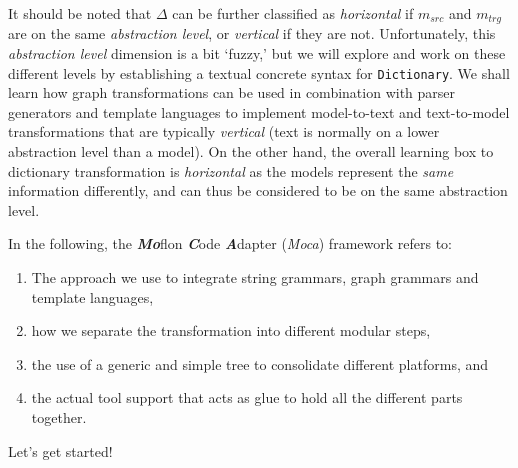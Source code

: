 \newpage

It should be noted that $\Delta$ can be further classified as \emph{horizontal} if $m_{src}$ and $m_{trg}$ are on the same
\emph{abstraction level}, or \emph{vertical} if they are not. Unfortunately, this \emph{abstraction level} dimension is a bit `fuzzy,' but we will explore and
work on these different levels by establishing a textual concrete syntax for \texttt{Dictionary}. We shall learn how graph transformations can be used in
combination with parser generators and template languages to implement model-to-text and text-to-model transformations that are typically \emph{vertical} (text
is normally on a lower abstraction level than a model). On the other hand, the overall learning box to dictionary transformation is \emph{horizontal} as the
models represent the \emph{same} information differently, and can thus be considered to be on the same abstraction level.

In the following, the \emph{\bf Mo}flon \emph{\bf C}ode \emph{\bf A}dapter (\emph{Moca}) framework refers to:
\begin{enumerate}

 \item The approach we use to integrate string grammars, graph grammars and template languages, 

 \item how we separate the transformation into different modular steps, 

 \item the use of a generic and simple tree to consolidate different platforms, and 

 \item the actual tool support that acts as glue to hold all the different parts together.

\end{enumerate}



Let's get started!
